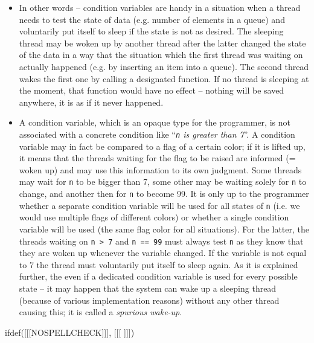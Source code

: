\begin{itemize}
\item In other words -- condition variables are handy in a situation when a
thread needs to test the state of  data (e.g. number of elements in
a queue) and voluntarily put itself to sleep if the state is not as desired.
The sleeping thread may be woken up by another thread after the latter
changed the state of the data in a way that the situation which the first thread
was waiting on actually happened (e.g. by inserting an item into a queue).  The
second thread wakes the first one by calling a designated function.  If no
thread is sleeping at the moment, that function would have no effect -- nothing
will be saved anywhere, it is as if it never happened.
\item A condition variable, which is an opaque type for the programmer, is not
associated with a concrete condition like ``\emph{\texttt{n} is greater than
7}''.  A condition variable may in fact be compared to a flag of a certain
color; if it is lifted up, it means that the threads waiting for the flag to be
raised are informed (= woken up) and may use this information to its own
judgment.  Some threads may wait for \texttt{n} to be bigger than 7, some other
may be waiting solely for \texttt{n} to change, and another then for \texttt{n}
to become 99.  It is only up to the programmer whether a separate condition
variable will be used for all states of \texttt{n} (i.e. we would use multiple
flags of different colors) or whether a single condition variable will be used
(the same flag color for all situations).  For the latter, the threads waiting
on \texttt{n > 7} and \texttt{n == 99} must always test \texttt{n} as they know
that they are woken up whenever the variable changed.  If the variable is not
equal to 7 the thread must voluntarily put itself to sleep again.  As it is
explained further, the  even if a dedicated condition variable is used for every possible
state -- it may happen that the system can wake up a sleeping thread (because
of various implementation reasons) without any other thread causing this; it is
called a \emph{spurious wake-up}.
\end{itemize}


ifdef([[[NOSPELLCHECK]]], [[[
]]])

